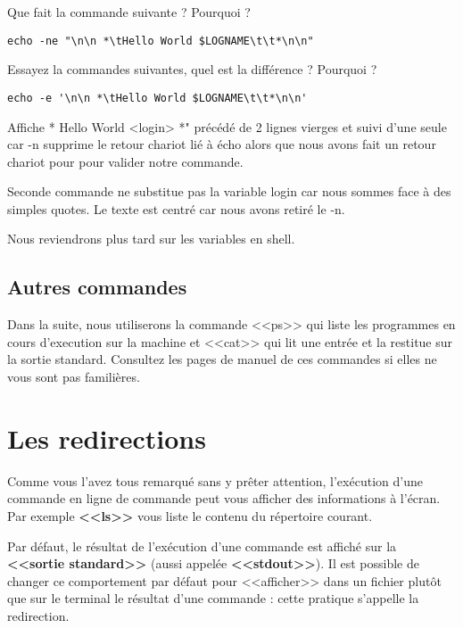 \documentclass[11pt]{article}
\begin{document}
Que fait la commande suivante ? Pourquoi ?

\begin{lstlisting}[alsoletter={*},emph={*}]
echo -ne "\n\n *\tHello World $LOGNAME\t\t*\n\n"
\end{lstlisting}

Essayez la commandes suivantes, quel est la différence ? Pourquoi ?

\begin{lstlisting}[alsoletter={*},emph={*}]
echo -e '\n\n *\tHello World $LOGNAME\t\t*\n\n'
\end{lstlisting}

\begin{solution}

Affiche  *      Hello World <login>    *" précédé de 2 lignes vierges et suivi d'une seule car -n supprime le retour chariot lié à écho alors que nous avons fait un retour chariot pour pour valider notre commande.

Seconde commande ne substitue pas la variable login car nous sommes face à des simples quotes. Le texte est centré car nous avons retiré le -n.

Nous reviendrons plus tard sur les variables en shell.
\end{solution}

\subsection{Autres commandes}

Dans la suite, nous utiliserons la commande <<ps>> qui liste les programmes en cours d'execution sur la machine et <<cat>> qui lit une entrée et la restitue sur la sortie standard. Consultez les pages de manuel de ces commandes si elles ne vous sont pas familières.

\section{Les redirections}

Comme vous l’avez tous remarqué sans y prêter attention, l’exécution d’une commande en ligne de commande peut vous
afficher des informations à l’écran. Par exemple \textbf{<<ls>>} vous liste le contenu du répertoire courant.

Par défaut, le résultat de l'exécution d'une commande est affiché sur la \textbf{<<sortie standard>>} (aussi appelée \textbf{<<stdout>>}). Il est possible
de changer ce comportement par défaut pour <<afficher>> dans un fichier plutôt que sur le terminal le résultat d'une
commande : cette pratique s’appelle la redirection.
\end{document}
